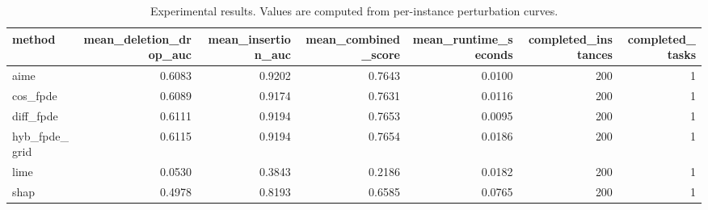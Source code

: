 \begin{table}[t]
\caption{Experimental results. Values are computed from per-instance perturbation curves.}
\label{tab:main_results_computed}
\centering
\begin{tabular}{lrrrrrr}
\toprule
method & mean\_deletion\_drop\_auc & mean\_insertion\_auc & mean\_combined\_score & mean\_runtime\_seconds & completed\_instances & completed\_tasks \\
\midrule
aime & 0.6083 & 0.9202 & 0.7643 & 0.0100 & 200 & 1 \\
cos\_fpde & 0.6089 & 0.9174 & 0.7631 & 0.0116 & 200 & 1 \\
diff\_fpde & 0.6111 & 0.9194 & 0.7653 & 0.0095 & 200 & 1 \\
hyb\_fpde\_grid & 0.6115 & 0.9194 & 0.7654 & 0.0186 & 200 & 1 \\
lime & 0.0530 & 0.3843 & 0.2186 & 0.0182 & 200 & 1 \\
shap & 0.4978 & 0.8193 & 0.6585 & 0.0765 & 200 & 1 \\
\bottomrule
\end{tabular}

\end{table}
